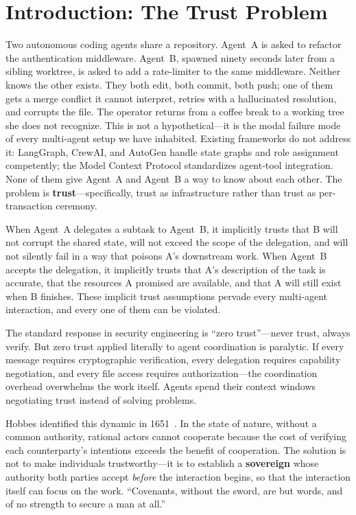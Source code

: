 \documentclass[11pt,a4paper]{article}
\theoremstyle{definition}
\theoremstyle{remark}
\begin{document}
\section{Introduction: The Trust Problem}

Two autonomous coding agents share a repository. Agent~A is asked to refactor the authentication middleware. Agent~B, spawned ninety seconds later from a sibling worktree, is asked to add a rate-limiter to the same middleware. Neither knows the other exists. They both edit, both commit, both push; one of them gets a merge conflict it cannot interpret, retries with a hallucinated resolution, and corrupts the file. The operator returns from a coffee break to a working tree she does not recognize. This is not a hypothetical---it is the modal failure mode of every multi-agent setup we have inhabited. Existing frameworks do not address it: LangGraph, CrewAI, and AutoGen handle state graphs and role assignment competently; the Model Context Protocol standardizes agent-tool integration. None of them give Agent~A and Agent~B a way to know about each other. The problem is \textbf{trust}---specifically, trust as infrastructure rather than trust as per-transaction ceremony.

When Agent~A delegates a subtask to Agent~B, it implicitly trusts that B will not corrupt the shared state, will not exceed the scope of the delegation, and will not silently fail in a way that poisons A's downstream work. When Agent~B accepts the delegation, it implicitly trusts that A's description of the task is accurate, that the resources A promised are available, and that A will still exist when B finishes. These implicit trust assumptions pervade every multi-agent interaction, and every one of them can be violated.

The standard response in security engineering is ``zero trust''---never trust, always verify. But zero trust applied literally to agent coordination is paralytic. If every message requires cryptographic verification, every delegation requires capability negotiation, and every file access requires authorization---the coordination overhead overwhelms the work itself. Agents spend their context windows negotiating trust instead of solving problems.

Hobbes identified this dynamic in 1651~\cite{hobbes1651leviathan}. In the state of nature, without a common authority, rational actors cannot cooperate because the cost of verifying each counterparty's intentions exceeds the benefit of cooperation. The solution is not to make individuals trustworthy---it is to establish a \textbf{sovereign} whose authority both parties accept \emph{before} the interaction begins, so that the interaction itself can focus on the work. ``Covenants, without the sword, are but words, and of no strength to secure a man at all.''
\end{document}
